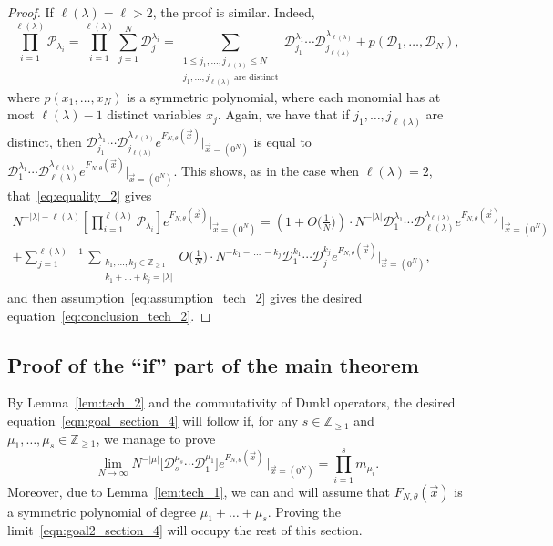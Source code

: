 \documentclass[11pt]{article}
\theoremstyle{plain}
\renewcommand{\P}{\mathcal P}
\newcommand{\D}{\mathcal D}
\newcommand{\Z}{\mathbb Z}
\newcommand{\la}{\lambda}
\newcommand{\vecx}{\vec{x}}
\newcommand{\zeroes}{\vec{x}=(0^N)}
\begin{document}
\begin{proof}
\smallskip

If $\ell(\la)=\ell>2$, the proof is similar.
Indeed,
\begin{equation}\label{eq:equality_2}
\prod_{i=1}^{\ell(\la)}{\P_{\la_i}} = \prod_{i=1}^{\ell(\la)}{\sum_{j=1}^N{\D_j^{\la_i}}} = \sum_{\substack{1\le j_1,\dots,j_{\ell(\la)}\le N \\ j_1,\dots,j_{\ell(\la)}\text{ are distinct}}}{\D_{j_1}^{\la_1}\cdots\D_{j_{\ell(\la)}}^{\la_{\ell(\la)}}} + p(\D_1,\dots,\D_N),
\end{equation}
where $p(x_1,\dots,x_N)$ is a symmetric polynomial, where each monomial has at most $\ell(\la)-1$ distinct variables $x_j$.
Again, we have that if $j_1,\dots,j_{\ell(\la)}$ are distinct, then $\D_{j_1}^{\la_1}\cdots\D_{j_{\ell(\la)}}^{\la_{\ell(\la)}} e^{F_{N,\theta}(\vecx)}\big|_{\vecx=(0^N)}$ is equal to $\D_1^{\la_1}\cdots\D_{\ell(\la)}^{\la_{\ell(\la)}} e^{F_{N,\theta}(\vecx)}\big|_{\vecx=(0^N)}$. This shows, as in the case when $\ell(\la)=2$, that~\eqref{eq:equality_2} gives
\begin{multline*}
N^{-|\la|-\ell(\la)} \left[\prod_{i=1}^{\ell(\la)}{\P_{\la_i}}\right]  e^{F_{N,\theta}(\vecx)} \bigg|_{\vecx=(0^N)} = \left( 1 + O\Big( \frac{1}{N} \Big) \right)\cdot N^{-|\la|} \D_1^{\la_1}\cdots\D_{\ell(\la)}^{\la_{\ell(\la)}} e^{F_{N,\theta}(\vecx)}\big|_{\zeroes}\\
+ \sum_{j=1}^{\ell(\la)-1} \sum_{\substack{k_1,\dots,k_j\in\Z_{\ge 1} \\ k_1+\dots+k_j=|\la|}} O\Big( \frac{1}{N} \Big)\cdot N^{-k_1-\,\dots\,-k_j} \D_1^{k_1}\cdots\D_j^{k_j} e^{F_{N,\theta}(\vecx)}\big|_{\zeroes},
\end{multline*}
and then assumption~\eqref{eq:assumption_tech_2} gives the desired equation~\eqref{eq:conclusion_tech_2}.
\end{proof}


\subsection{Proof of the ``if'' part of the main theorem}


By Lemma~\ref{lem:tech_2} and the commutativity of Dunkl operators, the desired equation~\eqref{eqn:goal_section_4} will follow if, for any $s\in\Z_{\ge 1}$ and $\mu_1,\dots,\mu_s\in\Z_{\ge 1}$, we manage to prove
\begin{equation}\label{eqn:goal2_section_4}
\lim_{N\to\infty}{ N^{-|\mu|}\Big[ \D_s^{\mu_s}\cdots\D_1^{\mu_1} \Big] e^{ F_{N,\theta}(\vecx) } \,\Big|_{\vecx=(0^N)} } = \prod_{i=1}^s{ m_{\mu_i} }.
\end{equation}
Moreover, due to Lemma~\ref{lem:tech_1}, we can and will assume that $F_{N,\theta}(\vecx)$ is a symmetric polynomial of degree $\mu_1+\dots+\mu_s$.
Proving the limit~\eqref{eqn:goal2_section_4} will occupy the rest of this section.
\end{document}
